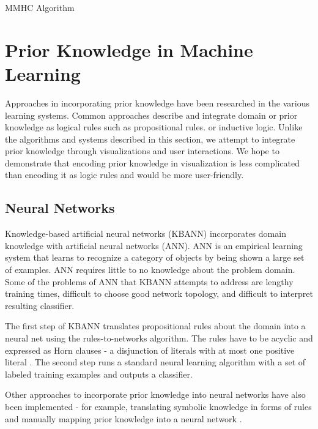 \begin{algorithm}
\caption{MMHC Algorithm}\label{PC}
\begin{algorithmic}[1]
\EndFor
{}
\EndProcedure
\end{algorithmic}
\end{algorithm}

\section{ Prior Knowledge in Machine Learning }
Approaches in incorporating prior knowledge have been researched in the various learning systems. Common approaches describe and integrate domain or prior knowledge as logical rules such as propositional rules. or inductive logic. Unlike the algorithms and systems described in this section, we attempt to integrate prior knowledge through visualizations and user interactions. We hope to demonstrate that encoding prior knowledge in visualization is less complicated than encoding it as logic rules and would be more user-friendly. 

\subsection{Neural Networks}
Knowledge-based artificial neural networks (KBANN) incorporates domain knowledge with artificial neural networks (ANN). ANN is an empirical learning system that learns to recognize a category of objects by being shown a large set of examples. ANN requires little to no knowledge about the problem domain. Some of the problems of ANN that KBANN attempts to address are lengthy training times, difficult to choose good network topology, and difficult to interpret resulting classifier. 

The first step of KBANN translates propositional rules about the domain into a neural net using the rules-to-networks algorithm. The rules have to be acyclic and expressed as Horn clauses - a disjunction of literals with at most one positive literal \cite{KBANN}. The second step runs a standard neural learning algorithm with a set of labeled training examples and outputs a classifier. 

Other approaches to incorporate prior knowledge into neural networks have also been implemented - for example, translating symbolic knowledge in forms of rules \cite{Fu} and manually mapping prior knowledge into a neural network \cite{Katz}.

